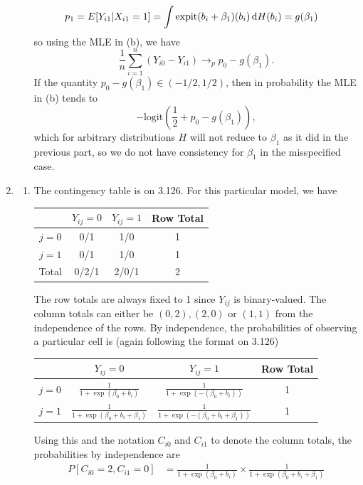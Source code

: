 \documentclass[11pt]{article}
\begin{document}
\begin{enumerate}
\begin{enumerate}
\begin{align*}
			p_1 &= E[Y_{i1}|X_{i1}=1] = \int \mathrm{expit}(b_i+\beta_1)(b_i)\dif H(b_i) = g(\beta_1)
		\end{align*}
		so using the MLE in (b), we have
		\[
			\frac{1}{n}\sum_{i=1}^n (Y_{i0}-Y_{i1}) \to_p p_0 - g(\beta_1).
		\]
		If the quantity $p_0-g(\beta_1)\in (-1/2,1/2)$, then in probability the MLE in (b) tends to
		\[
			-\mathrm{logit}(\frac{1}{2} +  p_0 - g(\beta_1)),
		\]
		which for arbitrary distributions $H$ will not reduce to $\beta_1$ as it did in the previous part, so we do not have consistency for $\beta_1$ in the misspecified case.
		\end{enumerate}
	\item
		\begin{enumerate}
			\item The contingency table is on 3.126. For this particular model, we have
			\begin{table}[H]
			\centering
				\begin{tabular}{c|cc|c}
				& $Y_{ij}=0$ & $Y_{ij}=1$ & Row Total \\
					\hline
					$j=0$ & 0/1 & 1/0 & 1\\
				$j=1$ & 0/1 & 1/0 & 1 \\
				\hline 
				Total & 0/2/1 & 2/0/1 & 2
				\end{tabular}
			\end{table}
			The row totals are always fixed to 1 since $Y_{ij}$ is binary-valued. The column totals can either be $(0,2), (2,0)$ or $(1,1)$ from the independence of the rows. By independence, the probabilities of observing a particular cell is (again following the format on 3.126)
			\begin{table}[H]
			\centering
				\begin{tabular}{c|cc|c}
				& $Y_{ij}=0$ & $Y_{ij}=1$ & Row Total \\
					\hline
					$j=0$ & $\frac{1}{1+\exp(\beta_0 + b_i)}$ & $\frac{1}{1+\exp(-(\beta_0 + b_i))}$ & 1\\
				$j=1$ & $\frac{1}{1+\exp(\beta_0 + b_i+\beta_1)}$ & $\frac{1}{1+\exp(-(\beta_0 + b_i+\beta_1))}$ & 1 \\
				\end{tabular}
			\end{table}
			Using this and the notation $C_{i0}$ and $C_{i1}$ to denote the column totals, the probabilities by independence are
			\begin{align*}
				P[C_{i0}=2, C_{i1}=0] &= \frac{1}{1+\exp(\beta_0 + b_i)}\times\frac{1}{1+\exp(\beta_0 + b_i+\beta_1)} \\

\end{align*}
\end{enumerate}
\end{enumerate}
\end{document}
